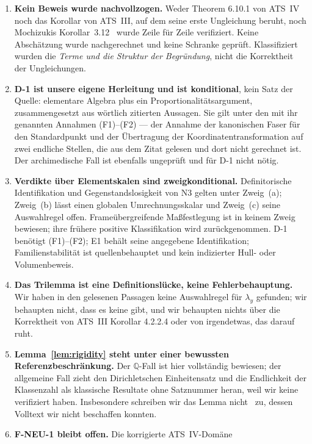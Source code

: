 \documentclass[11pt,a4paper]{article}
\theoremstyle{definition}
\theoremstyle{plain}
\theoremstyle{definition}
\begin{document}
\begin{enumerate}
\item \textbf{Kein Beweis wurde nachvollzogen.} Weder Theorem 6.10.1 von ATS~IV noch
  das Korollar von ATS~III, auf dem seine erste Ungleichung beruht, noch Mochizukis
  Korollar~3.12~\cite{Mochizuki2021c} wurde Zeile für Zeile verifiziert. Keine
  Abschätzung wurde nachgerechnet und keine Schranke geprüft. Klassifiziert wurden
  die \emph{Terme und die Struktur der Begründung}, nicht die Korrektheit der
  Ungleichungen.
\item \textbf{D-1 ist unsere eigene Herleitung und ist konditional}, kein Satz der
  Quelle: elementare
  Algebra plus ein Proportionalitätsargument, zusammengesetzt aus wörtlich zitierten
  Aussagen. Sie gilt unter den mit ihr genannten Annahmen (F1)--(F2) --- der Annahme
  der kanonischen Faser für den Standardpunkt und der Übertragung der
  Koordinatentransformation auf zwei endliche Stellen, die aus dem Zitat gelesen und
  dort nicht gerechnet ist. Der archimedische Fall ist ebenfalls ungeprüft und für
  D-1 nicht nötig.
\item \textbf{Verdikte über Elementskalen sind zweigkonditional.}
  Definitorische Identifikation und Gegenstandslosigkeit von N3 gelten unter
  Zweig~(a); Zweig~(b) lässt einen globalen Umrechnungsskalar und Zweig~(c)
  seine Auswahlregel offen. Frameübergreifende Maßfestlegung ist in keinem
  Zweig bewiesen; ihre frühere positive Klassifikation wird zurückgenommen.
  D-1 benötigt (F1)--(F2); E1 behält seine angegebene Identifikation;
  Familienstabilität ist quellenbehauptet und kein indizierter Hull- oder
  Volumenbeweis.
\item \textbf{Das Trilemma ist eine Definitionslücke, keine Fehlerbehauptung.} Wir
  haben in den gelesenen Passagen keine Auswahlregel für $\lambda_y$ gefunden; wir
  behaupten nicht, dass es keine gibt, und wir behaupten nichts über die Korrektheit
  von ATS~III Korollar 4.2.2.4 oder von irgendetwas, das darauf ruht.
\item \textbf{Lemma~\ref{lem:rigidity} steht unter einer bewussten
  Referenzbeschränkung.} Der $\mathbb{Q}$-Fall ist hier vollständig bewiesen; der
  allgemeine Fall zieht den Dirichletschen Einheitensatz und die Endlichkeit der
  Klassenzahl als klassische Resultate ohne Satznummer heran, weil wir keine
  verifiziert haben. Insbesondere schreiben wir das Lemma
  nicht~\cite{ArtinWhaples1945} zu, dessen Volltext wir nicht beschaffen konnten.
\item \textbf{F-NEU-1 bleibt offen.} Die korrigierte ATS~IV-Domäne

\end{enumerate}
\end{document}
